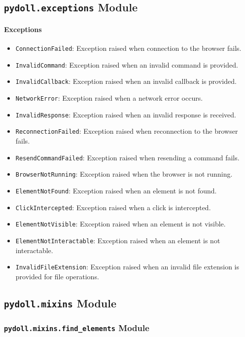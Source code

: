 \documentclass{article}
\begin{document}
\subsection*{\texttt{pydoll.exceptions} Module}

\paragraph{Exceptions}
\begin{itemize}
    \item \texttt{ConnectionFailed}: Exception raised when connection to the browser fails.
    \item \texttt{InvalidCommand}: Exception raised when an invalid command is provided.
    \item \texttt{InvalidCallback}: Exception raised when an invalid callback is provided.
    \item \texttt{NetworkError}: Exception raised when a network error occurs.
    \item \texttt{InvalidResponse}: Exception raised when an invalid response is received.
    \item \texttt{ReconnectionFailed}: Exception raised when reconnection to the browser fails.
    \item \texttt{ResendCommandFailed}: Exception raised when resending a command fails.
    \item \texttt{BrowserNotRunning}: Exception raised when the browser is not running.
    \item \texttt{ElementNotFound}: Exception raised when an element is not found.
    \item \texttt{ClickIntercepted}: Exception raised when a click is intercepted.
    \item \texttt{ElementNotVisible}: Exception raised when an element is not visible.
    \item \texttt{ElementNotInteractable}: Exception raised when an element is not interactable.
    \item \texttt{InvalidFileExtension}: Exception raised when an invalid file extension is provided for file operations.
\end{itemize}

\hrulefill

\subsection*{\texttt{pydoll.mixins} Module}

\subsubsection*{\texttt{pydoll.mixins.find\_elements} Module}
\end{document}
